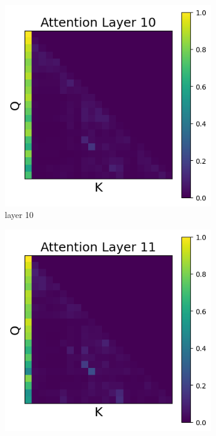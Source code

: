 \documentclass[11pt]{article}
\begin{document}
\begin{figure}[t]
    \begin{subfigure}[t]{0.24\textwidth}
    \centering
    \includegraphics[width=1.4\columnwidth]{figures/intervention5_2/layer_10.png}
    \caption{layer 10}
  \end{subfigure}\hfill
    \begin{subfigure}[t]{0.24\textwidth}
    \centering
    \includegraphics[width=1.4\columnwidth]{figures/intervention5_2/layer_11.png}

\end{subfigure}
\end{figure}
\end{document}
